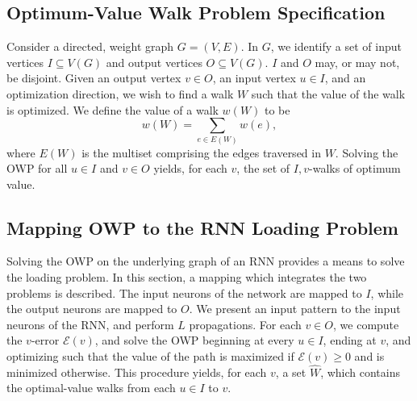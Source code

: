 \documentclass[journal]{IEEEtran}
\begin{document}

\subsection{Optimum-Value Walk Problem Specification}

Consider a directed, weight graph $G=(V,E)$. In $G$, we identify a set of input vertices $I \subseteq V(G)$ and output vertices $O \subseteq V(G)$. $I$ and $O$ may, or may not, be disjoint. Given an output vertex $v \in O$, an input vertex $u\in I$, and an optimization direction, we wish to find a walk $W$ such that the value of the walk is optimized. We define the value of a walk $w(W)$ to be 
\begin{equation}
w(W) = \sum_{e\in E(W)}w(e),
\label{eq:walk_value}
\end{equation} 
\noindent where $E(W)$ is the multiset comprising the edges traversed in $W$. Solving the OWP for all $u\in I$ and $v\in O$ yields, for each $v$, the set of $I,v$-walks of optimum value. 

\subsection{Mapping OWP to the RNN Loading Problem}

Solving the OWP on the underlying graph of an RNN provides a means to solve the loading problem. In this section, a mapping which integrates the two problems is described. The input neurons of the network are mapped to $I$, while the output neurons are mapped to $O$. We present an input pattern to the input neurons of the RNN, and perform $L$ propagations. For each $v\in O$, we compute the $v$-error $\mathcal{E}(v)$, and solve the OWP beginning at every $u\in I$, ending at $v$, and optimizing such that the value of the path is maximized if $\mathcal{E}(v)\geq0$ and is minimized otherwise. This procedure yields, for each $v$, a set $\hat{W}$, which contains the optimal-value walks from each $u\in I$ to $v$. 
\end{document}
